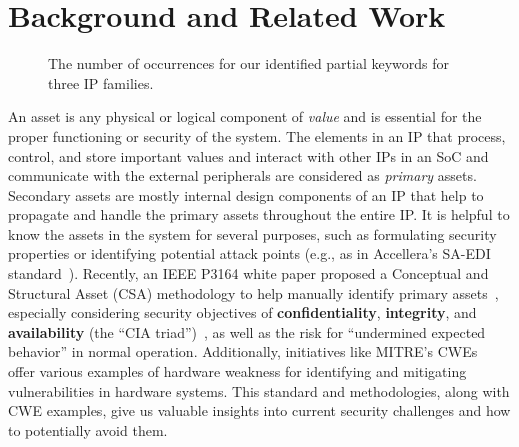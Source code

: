 \section{Background and Related Work\label{sec:background}
}

\begin{figure*}[t]
\centering
{}\hfill
{}\hfill
{}
\caption{The number of occurrences for our identified partial keywords for three IP families.\label{fig:explanations_of_general_image}
}
\end{figure*}


An asset is any physical or logical component of \textit{value} and is essential for the proper functioning or security of the system\cite{holdings2009arm}.
The elements in an \ac{IP} that process, control, and store important values and interact with other \acp{IP} in an \ac{SoC} and communicate with the external peripherals are considered as \textit{primary} assets. 
Secondary assets are mostly internal design components of an \ac{IP} that help to propagate and handle the primary assets throughout the entire \ac{IP}.
It is helpful to know the assets in the system for several purposes, such as formulating security properties or identifying potential attack points (e.g., as in Accellera's \ac{SA-EDI} standard~\cite{accellera}). 
Recently, an IEEE P3164 white paper proposed a Conceptual and Structural Asset (CSA) methodology to help manually identify primary assets~\cite{ieee_p3164_working_group_asset_2024}, especially considering security objectives of \textbf{confidentiality}, \textbf{integrity}, and \textbf{availability} (the ``CIA triad'')~\cite{noauthor_what_nodate}, as well as the risk for ``undermined expected behavior'' in normal operation. 
Additionally, initiatives like MITRE's \acp{CWE}~\cite{mitreCommonWeakness} offer various examples of hardware weakness for identifying and mitigating vulnerabilities in hardware systems. 
This standard and methodologies, along with \ac{CWE} examples, give us valuable insights into current security challenges and how to potentially avoid them. 

